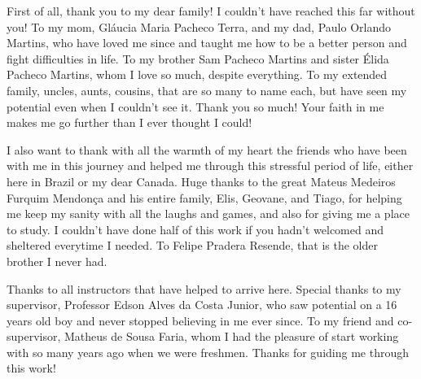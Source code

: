 \begin{agradecimentos}

First of all, thank you to my dear family! I couldn't have reached this far without you! To my mom, Gláucia Maria Pacheco Terra, and my dad, Paulo Orlando Martins, who have loved me since and taught me how to be a better person and fight difficulties in life. To my brother Sam Pacheco Martins and sister Élida Pacheco Martins, whom I love so much, despite everything. To my extended family, uncles, aunts, cousins, that are so many to name each, but have seen my potential even when I couldn't see it. Thank you so much! Your faith in me makes me go further than I ever thought I could!

I also want to thank with all the warmth of my heart the friends who have been with me in this journey and helped me through this stressful period of life, either here in Brazil or my dear Canada. Huge thanks to the great Mateus Medeiros Furquim Mendonça and his entire family, Elis, Geovane, and Tiago, for helping me keep my sanity with all the laughs and games, and also for giving me a place to study. I couldn't have done half of this work if you hadn't welcomed and sheltered everytime I needed. To Felipe Pradera Resende, that is the older brother I never had.

Thanks to all instructors that have helped to arrive here. Special thanks to my supervisor, Professor Edson Alves da Costa Junior, who saw potential on a 16 years old boy and never stopped believing in me ever since. To my friend and co-supervisor, Matheus de Sousa Faria, whom I had the pleasure of start working with so many years ago when we were freshmen. Thanks for guiding me through this work!

\end{agradecimentos}
